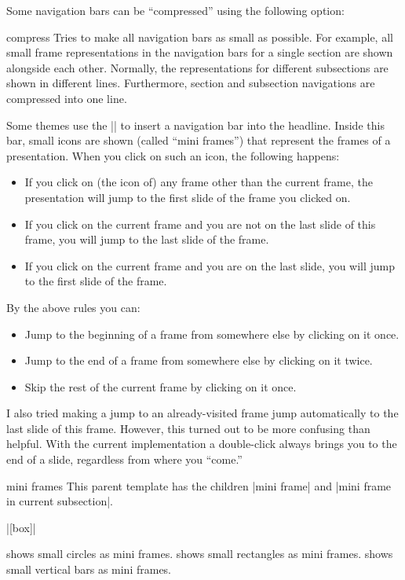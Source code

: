 Some navigation bars can be ``compressed'' using the following option:

\begin{classoption}{compress}
  Tries to make all navigation bars as small as possible. For example,
  all small frame representations in the navigation bars for a single
  section are shown alongside each other. Normally, the representations
  for different subsections are shown in different lines. Furthermore,
  section and subsection navigations are compressed into one line.
\end{classoption}



Some themes use the |\insertnavigation| to insert a navigation bar
into the headline. Inside this bar, small icons are shown (called
``mini frames'') that represent the frames of a presentation. 
When you click on such an icon, the
following happens: 
\begin{itemize}
\item
  If you click on (the icon of) any frame other than the current frame, the
  presentation will jump to the first slide of the frame you clicked
  on.
\item
  If you click on the current frame and you are not on the last slide
  of this frame, you will jump to the last slide of the frame.
\item
  If you click on the current frame and you are on the last slide, you
  will jump to the first slide of the frame.
\end{itemize}
By the above rules you can:
\begin{itemize}
\item
  Jump to the beginning of a frame from somewhere else by clicking on
  it once.  
\item
  Jump to the end of a frame from somewhere else by clicking on it
  twice.
\item
  Skip the rest of the current frame by clicking on it once.
\end{itemize}

I also tried making a jump to an already-visited frame jump
automatically to the last slide of this frame. However, this turned
out to be more confusing than helpful. With the current implementation
a double-click always brings you to the end of a slide, regardless
from where you ``come.''

\begin{element}{mini frames}\semiyes\no\no
  This parent template has the children |mini frame| and
  |mini frame in current subsection|.

  \example |[box]|

  \begin{templateoptions}
    shows small circles as mini frames.
    shows small rectangles as mini frames.
    shows small vertical bars as mini frames.
  \end{templateoptions}
\end{element}

